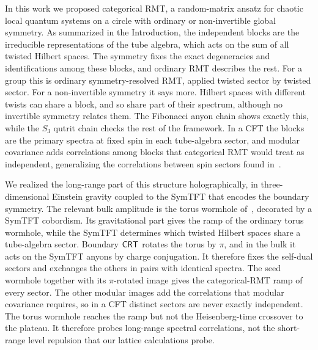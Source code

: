 \documentclass[11pt]{article}
\numberwithin{equation}{section}
\begin{document}
In this work we proposed categorical RMT, a random-matrix ansatz for chaotic local quantum systems on a circle with ordinary or non-invertible global symmetry. As summarized in the Introduction, the independent blocks are the irreducible representations of the tube algebra, which acts on the sum of all twisted Hilbert spaces. The symmetry fixes the exact degeneracies and identifications among these blocks, and ordinary RMT describes the rest. For a group this is ordinary symmetry-resolved RMT, applied twisted sector by twisted sector. For a non-invertible symmetry it says more. Hilbert spaces with different twists can share a block, and so share part of their spectrum, although no invertible symmetry relates them. The Fibonacci anyon chain shows exactly this, while the $S_3$ qutrit chain checks the rest of the framework. In a CFT the blocks are the primary spectra at fixed spin in each tube-algebra sector, and modular covariance adds correlations among blocks that categorical RMT would treat as independent, generalizing the correlations between spin sectors found in~\cite{Haehl:2023mhf,DiUbaldo:2023qli}.

We realized the long-range part of this structure holographically, in three-dimensional Einstein gravity coupled to the SymTFT that encodes the boundary symmetry. The relevant bulk amplitude is the torus wormhole of~\cite{Cotler:2020ugk}, decorated by a SymTFT cobordism. Its gravitational part gives the ramp of the ordinary torus wormhole, while the SymTFT determines which twisted Hilbert spaces share a tube-algebra sector. Boundary $\mathsf{CRT}$ rotates the torus by $\pi$, and in the bulk it acts on the SymTFT anyons by charge conjugation. It therefore fixes the self-dual sectors and exchanges the others in pairs with identical spectra. The seed wormhole together with its $\pi$-rotated image gives the categorical-RMT ramp of every sector. The other modular images add the correlations that modular covariance requires, so in a CFT distinct sectors are never exactly independent. The torus wormhole reaches the ramp but not the Heisenberg-time crossover to the plateau. It therefore probes long-range spectral correlations, not the short-range level repulsion that our lattice calculations probe.
\end{document}
